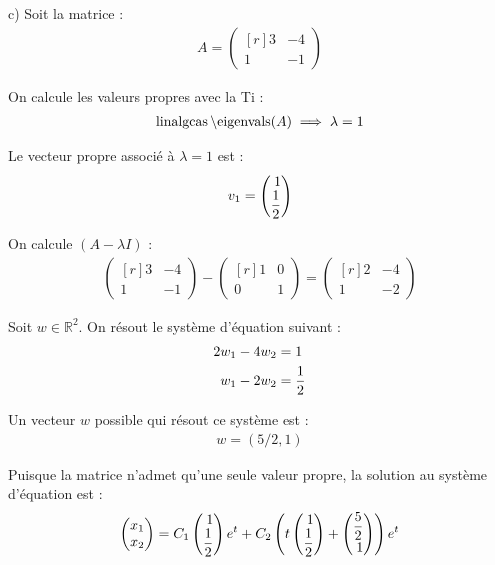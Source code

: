 c) Soit la matrice :
\begin{align*}
    A =
    \begin{pmatrix*}[r]
	3&-4\\
	1&-1
    \end{pmatrix*}
\end{align*}

On calcule les valeurs propres avec la Ti :
\begin{align*}
    \operatorname{linalgcas}\operatorname{\text{\textbackslash}eigenvals}(A)\implies\lambda = 1
\end{align*}

Le vecteur propre associé à $\lambda = 1$ est :
\begin{align*}
    v_1 = \begin{pmatrix*}[r]
    	1\\\f{1}{2}
    \end{pmatrix*}
\end{align*}

On calcule $(A-\lambda I)$ :
\begin{align*}
    \begin{pmatrix*}[r]
	3&-4\\
	1&-1
    \end{pmatrix*} -
    \begin{pmatrix*}[r]
	1&0\\
	0&1
    \end{pmatrix*} =
    \begin{pmatrix*}[r]
	2&-4\\
	1&-2
    \end{pmatrix*}
\end{align*}

Soit $w\in\mathbb{R}^2$. On résout le système d'équation suivant :
\begin{align*}
    2w_1 - 4w_2 &= 1 \\
    w_1 - 2w_2 &= \dfrac{1}{2}
\end{align*}

Un vecteur $w$ possible qui résout ce système est :
\begin{align*}
    w = (5/2, 1)
\end{align*}

Puisque la matrice n'admet qu'une seule valeur propre,
la solution au système d'équation est :
\begin{align*}
    \begin{pmatrix*}[r]
        x_1\\x_2
    \end{pmatrix*} = 
    C_1
    \begin{pmatrix*}[r]
        1\\\f{1}{2}
    \end{pmatrix*}e^{t}
    +C_2\prt{
	t
	\begin{pmatrix*}[r]
	    1\\\f{1}{2}
	\end{pmatrix*}
	+
	\begin{pmatrix*}[r]
	    \f{5}{2}\\1
	\end{pmatrix*}
    }e^{t}
\end{align*}
